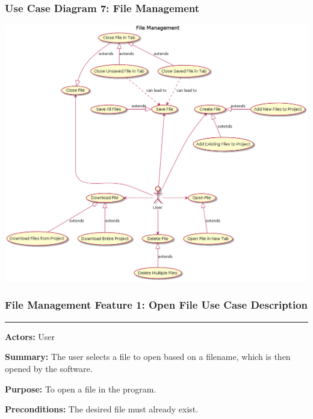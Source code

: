 \documentclass[twoside,letterpaper]{article}
\begin{document}
\subsubsection[Use Case Diagram 7: File Management]{\rmfamily\bfseries\color{black}
	Use Case Diagram 7: File Management}
\hypertarget{RefHeading22059017292}{}

\includegraphics[width=\textwidth]{images/UseCaseDiagrams/FileManagement}

\newpage

\subsubsection[File Management Feature 1: Open File Use Case Description]{\rmfamily\bfseries\color{black}
	File Management Feature 1: Open File Use Case Description}
\hypertarget{RefHeading22059017292}{}

\vspace{2pt}
\hrule
\vspace{8pt}
\textbf{Actors:} User \newline

\noindent\textbf{Summary:} The user selects a file to open based on a filename, which is then opened by the software. \newline

\noindent\textbf{Purpose:} To open a file in the program. \newline

\noindent\textbf{Preconditions:} The desired file must already exist. \newline
\end{document}
